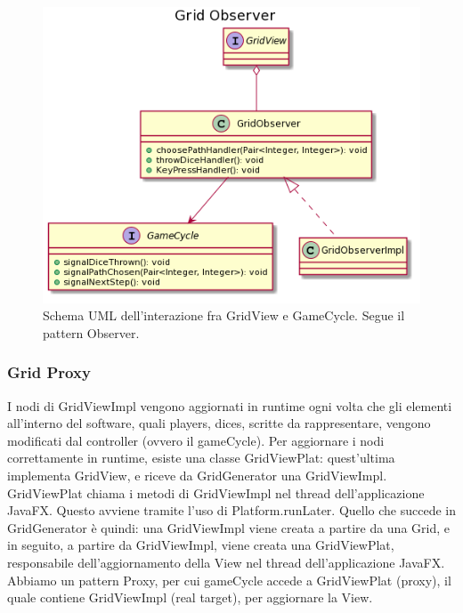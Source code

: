 \documentclass[a4paper,12pt]{report}
\begin{document}
	\begin{figure}[h]
	\centering{}
	\includegraphics[width=\textwidth]{images/ascenzo/grid_observer.png}
	\caption{Schema UML dell'interazione fra GridView e GameCycle. Segue il pattern Observer.}
	\label{img:gridobserver}
	\end{figure}

    \subsubsection {Grid Proxy}
	I nodi di GridViewImpl vengono aggiornati in runtime ogni volta che gli elementi all’interno del software, quali players, dices, scritte da rappresentare, vengono modificati dal controller (ovvero il gameCycle).
	Per aggiornare i nodi correttamente in runtime, esiste una classe GridViewPlat: quest'ultima implementa GridView, e riceve da GridGenerator una GridViewImpl.
	GridViewPlat chiama i metodi di GridViewImpl nel thread dell’applicazione JavaFX.
	Questo avviene tramite l’uso di Platform.runLater.
	Quello che succede in GridGenerator è quindi: una GridViewImpl viene creata a partire da una Grid, e in seguito, a partire da GridViewImpl, viene creata una GridViewPlat, responsabile dell’aggiornamento della View nel thread dell’applicazione JavaFX.
	Abbiamo un pattern Proxy, per cui gameCycle accede a GridViewPlat (proxy), il quale contiene GridViewImpl (real target), per aggiornare la View.
\end{document}
